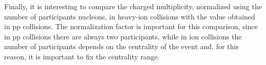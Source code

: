 Finally, it is interesting to compare the charged multiplicity, normalized using the number of participants nucleons, in heavy-ion collisions with the value obtained in pp collisions. The normalization factor is important for this comparison, since in pp collisions there are always two participants, while in ion collisions the number of participants depends on the centrality of the event and, for this reason, it is important to fix the centrality range.
%
\begin{figure}
  \centering
  \quad

\end{figure}

